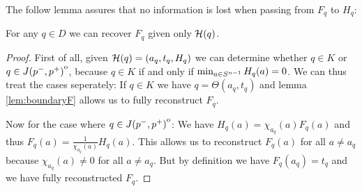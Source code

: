The follow lemma assures that no information is lost when passing from $F_q$ to $H_q$:
\begin{lemma}
    For any $q\in D$ we can recover $F_q$ given only ${\mathcal{H}}(q)$.
\end{lemma}
\begin{proof}
    First of all, given ${\mathcal{H}}(q)=(a_q,t_q, H_q)$ we can determine whether $q\in K$ or $q\in {\kern0ptJ(p^-,p^+)}^{\mathrm{o}}$, because $q\in K$ if and only if $\min_{a\in {S^{n-1}}} H_q(a)=0$. We can thus treat the cases seperately: If $q\in K$ we have $q=\Theta(a_q,t_q)$ and lemma \ref{lem:boundaryF} allows us to fully reconstruct $F_q$.

    Now for the case where $q\in {\kern0ptJ(p^-,p^+)}^{\mathrm{o}}$: We have $H_q(a)=\chi_{a_q}(a)F_q(a)$ and thus $F_q(a) = \frac{1}{\chi_{a_q}(a)}H_q(a)$. This allows us to reconstruct $F_q(a)$ for all $a\neq a_q$ because $\chi_{a_q}(a)\neq 0$ for all $a\neq a_q$. But by definition we have $F_q(a_q)=t_q$ and we have fully  reconstructed $F_q$.
\end{proof}


